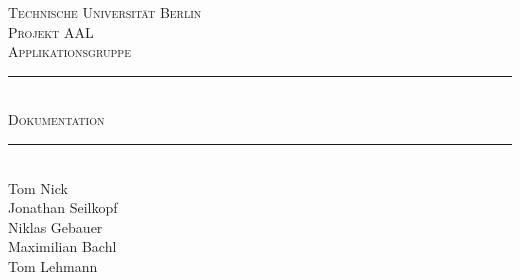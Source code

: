 \documentclass[10pt,a4paper]{report}
\newcommand{\HRule}{\rule{\linewidth}{0.1pt}} %
\begin{document}


\begin{titlepage}


\center %
 

\textsc{\LARGE Technische Universität Berlin}\\[2.5cm] %
\textsc{\Large Projekt AAL}\\[0.5cm] %
\textsc{\large Applikationsgruppe}\\[0.5cm] %



\HRule \\[0.6cm]
{ \textsc{\Huge Dokumentation}}\\[0.4cm] %
\HRule \\[1.5cm]
 


Tom Nick\\
Jonathan Seilkopf\\
Niklas Gebauer\\
Maximilian Bachl\\
Tom Lehmann\\
[3cm] %


\end{titlepage}
\end{document}
